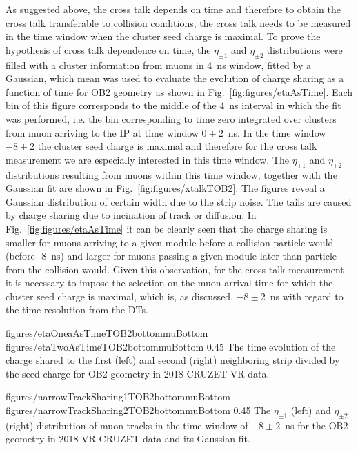 As suggested above, the cross talk depends on time and therefore to obtain the cross talk transferable to collision conditions, the cross talk needs to be measured in the time window when the cluster seed charge is maximal. To prove the hypothesis of cross talk dependence on time, the $\eta_{\pm 1}$ and $\eta_{\pm 2}$ distributions were filled with a cluster information from muons in 4~ns window, fitted by a Gaussian, which mean was used to evaluate the evolution of charge sharing as a function of time for OB2 geometry as shown in Fig.~\ref{fig:figures/etaAsTime}. Each bin of this figure corresponds to the middle of the 4~ns interval in which the fit was performed, i.e. the bin corresponding to time zero integrated over clusters from muon arriving to the IP at time window $0 \pm 2$~ns. In the time window $-8 \pm 2$ the cluster seed charge is maximal and therefore for the cross talk measurement we are especially interested in this time window. The  $\eta_{\pm 1}$ and $\eta_{\pm 2}$ distributions resulting from muons within this time window, together with the Gaussian fit are shown in Fig.~\ref{fig:figures/xtalkTOB2}. The figures reveal a Gaussian distribution of certain width due to the strip noise. The tails are caused by charge sharing due to incination of track or diffusion. In Fig.~\ref{fig:figures/etaAsTime} it can be clearly seen that the charge sharing is smaller for muons arriving to a given module before a collision particle would (before -8~ns) and larger for muons passing a given module later than particle from the collision would. Given this observation, for the cross talk measurement it is necessary to impose the selection on the muon arrival time for which the cluster seed charge is maximal, which is, as discussed, $-8 \pm 2$~ns with regard to the time resolution from the DTs.


                 {figures/etaOneaAsTimeTOB2bottommuBottom}
                 {figures/etaTwoAsTimeTOB2bottommuBottom} %
                 {0.45}       %
                 { The time evolution of the charge shared to the first (left) and second (right) neighboring strip divided by the seed charge for OB2 geometry in 2018 CRUZET VR data.}

                 {figures/narrowTrackSharing1TOB2bottommuBottom}
                 {figures/narrowTrackSharing2TOB2bottommuBottom} %
                 {0.45}       %
                 { The $\eta_{\pm 1}$ (left) and  $\eta_{\pm 2}$ (right) distribution of muon tracks in the time window of $-8 \pm 2$~ns for the OB2 geometry in 2018 VR CRUZET data and its Gaussian fit.}


